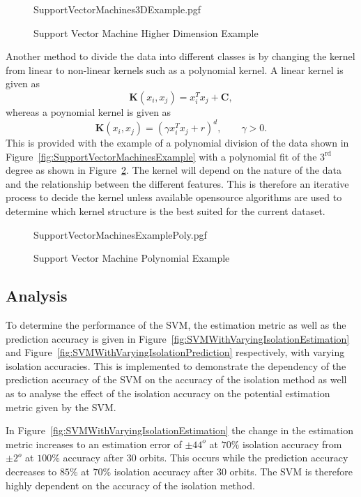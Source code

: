 \begin{figure}[!hbt]
	\centering
	{SupportVectorMachines3DExample.pgf}
	\caption{Support Vector Machine Higher Dimension Example}
	\label{fig:SupportVectorMachines3DExample}
\end{figure}

Another method to divide the data into different classes is by changing the kernel from linear to non-linear kernels such as a polynomial kernel. A linear kernel is given as 
\begin{equation}
\mathbf{K}\left(x_i,x_j \right) = x_i^Tx_j+ \mathbf{C},
\end{equation}
whereas a poynomial kernel is given as
\begin{equation}
\mathbf{K}\left(x_i,x_j \right) = \left(\gamma x_i^Tx_j + r \right)^d, \qquad \gamma > 0.
\end{equation}
This is provided with the example of a polynomial division of the data shown in Figure~\ref{fig:SupportVectorMachinesExample} with a polynomial fit of the $3^{\text{rd}}$ degree as shown in Figure~\ref{fig:SupportVectorMachinesExamplePoly}. The kernel will depend on the nature of the data and the relationship between the different features. This is therefore an iterative process to decide the kernel unless available opensource algorithms are used to determine which kernel structure is the best suited for the current dataset.

\begin{figure}[!hbt]
	\centering
	{SupportVectorMachinesExamplePoly.pgf}
	\caption{Support Vector Machine Polynomial Example}
	\label{fig:SupportVectorMachinesExamplePoly}
\end{figure}

\subsection{Analysis}
To determine the performance of the SVM, the estimation metric as well as the prediction accuracy is given in Figure~\ref{fig:SVMWithVaryingIsolationEstimation} and Figure~\ref{fig:SVMWithVaryingIsolationPrediction} respectively, with varying isolation accuracies. This is implemented to demonstrate the dependency of the prediction accuracy of the SVM on the accuracy of the isolation method as well as to analyse the effect of the isolation accuracy on the potential estimation metric given by the SVM.

In Figure~\ref{fig:SVMWithVaryingIsolationEstimation} the change in the estimation metric increases to an estimation error of $\pm 44^o$ at $70\%$ isolation accuracy from $\pm 2^o$ at $100\%$ accuracy after $30$ orbits. This occurs while the prediction accuracy decreases to $85\%$ at $70\%$ isolation accuracy after $30$ orbits. The SVM is therefore highly dependent on the accuracy of the isolation method.

